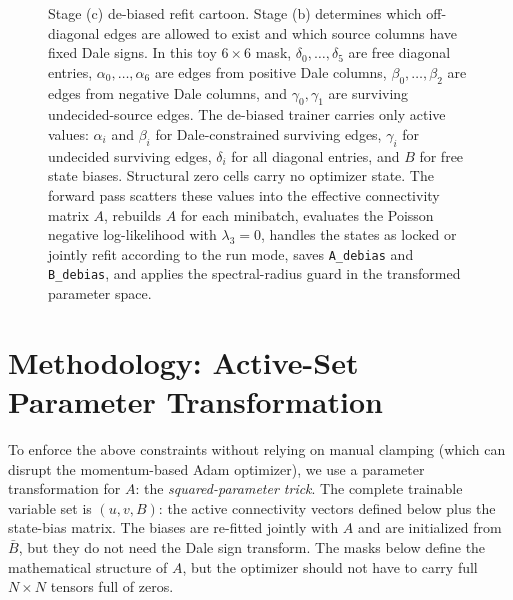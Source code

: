 \documentclass[11pt]{article}
\begin{document}
\begin{figure}[ht]
\caption{Stage (c) de-biased refit cartoon. Stage (b) determines which
off-diagonal edges are allowed to exist and which source columns have fixed
Dale signs. In this toy \(6\times6\) mask, \(\delta_0,\ldots,\delta_5\)
are free diagonal entries, \(\alpha_0,\ldots,\alpha_6\) are edges from
positive Dale columns, \(\beta_0,\ldots,\beta_2\) are edges from negative
Dale columns, and \(\gamma_0,\gamma_1\) are surviving undecided-source
edges. The de-biased trainer carries only active values: \(\alpha_i\) and
\(\beta_i\) for Dale-constrained surviving edges, \(\gamma_i\) for
undecided surviving edges, \(\delta_i\) for all diagonal entries, and \(B\)
for free state biases. Structural zero cells carry no optimizer state. The
forward pass scatters these values into the
effective connectivity matrix \(A\), rebuilds \(A\) for each minibatch,
evaluates the Poisson negative log-likelihood with \(\lambda_3=0\), handles
the states as locked or jointly refit according to the run mode, saves
\texttt{A\_debias} and \texttt{B\_debias}, and applies the spectral-radius
guard in the transformed parameter space.}
\label{fig:stage-c-debias-cartoon}
\end{figure}

\section{Methodology: Active-Set Parameter Transformation}

To enforce the above constraints without relying on manual clamping (which can disrupt the momentum-based Adam optimizer), we use a parameter transformation for $A$: the \textit{squared-parameter trick}. The complete trainable variable set is $(u,v,B)$: the active connectivity vectors defined below plus the state-bias matrix. The biases are re-fitted jointly with $A$ and are initialized from $\bar{B}$, but they do not need the Dale sign transform. The masks below define the mathematical structure of $A$, but the optimizer should not have to carry full $N\times N$ tensors full of zeros.
\end{document}
